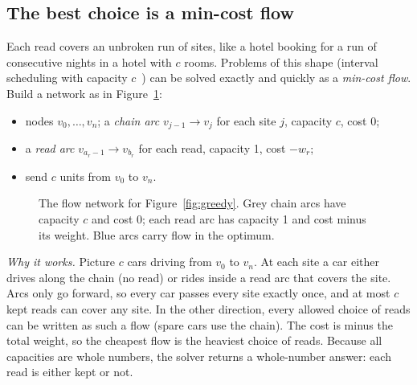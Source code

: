 \documentclass[11pt]{article}
\begin{document}
\subsection{The best choice is a min-cost flow}

Each read covers an unbroken run of sites, like a hotel booking for a run of
consecutive nights in a hotel with $c$ rooms. Problems of this shape
(interval scheduling with capacity $c$~\cite{arkin1987,carlisle1995}) can be
solved exactly and quickly as a \emph{min-cost flow}. Build a network as in
Figure~\ref{fig:flow}:

\begin{itemize}
\item nodes $v_0,\dots,v_n$; a \emph{chain arc} $v_{j-1}\to v_j$ for each
  site $j$, capacity $c$, cost 0;
\item a \emph{read arc} $v_{a_r-1}\to v_{b_r}$ for each read, capacity 1,
  cost $-w_r$;
\item send $c$ units from $v_0$ to $v_n$.
\end{itemize}

\begin{figure}[h]
\centering
{}
\caption{The flow network for Figure~\ref{fig:greedy}. Grey chain arcs have capacity $c$ and cost 0; each read arc has capacity 1 and cost minus its weight. Blue arcs carry flow in the optimum.}
\label{fig:flow}
\end{figure}

\emph{Why it works.} Picture $c$ cars driving from $v_0$ to $v_n$. At each
site a car either drives along the chain (no read) or rides inside a read
arc that covers the site. Arcs only go forward, so every car passes every
site exactly once, and at most $c$ kept reads can cover any site. In the
other direction, every allowed choice of reads can be written as such a
flow (spare cars use the chain). The cost is minus the total weight, so the
cheapest flow is the heaviest choice of reads. Because all capacities are
whole numbers, the solver returns a whole-number answer: each read is either
kept or not.
\end{document}
